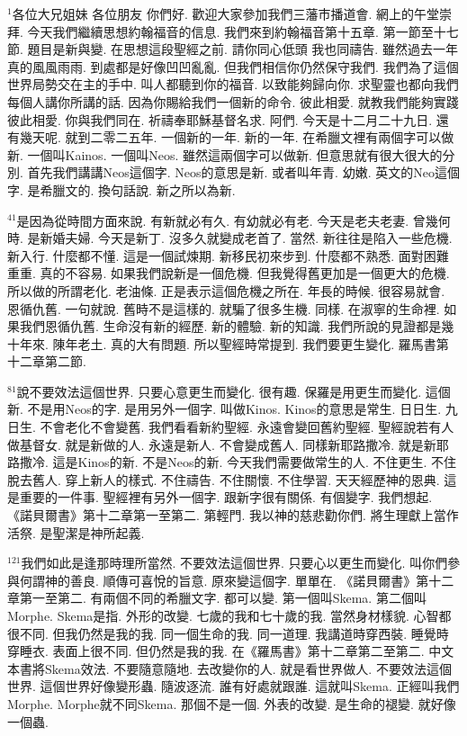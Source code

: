 \documentclass{book}
\begin{document}
$^{1}$各位大兄姐妹 各位朋友 你們好.
歡迎大家參加我們三藩市播道會.
網上的午堂崇拜.
今天我們繼續思想約翰福音的信息.
我們來到約翰福音第十五章.
第一節至十七節.
題目是新與變.
在思想這段聖經之前.
請你同心低頭 我也同禱告.
雖然過去一年真的風風雨雨.
到處都是好像凹凹亂亂.
但我們相信你仍然保守我們.
我們為了這個世界局勢交在主的手中.
叫人都聽到你的福音.
以致能夠歸向你.
求聖靈也都向我們每個人講你所講的話.
因為你賜給我們一個新的命令.
彼此相愛.
就教我們能夠實踐彼此相愛.
你與我們同在.
祈禱奉耶穌基督名求.
阿們.
今天是十二月二十九日.
還有幾天呢.
就到二零二五年.
一個新的一年.
新的一年.
在希臘文裡有兩個字可以做新.
一個叫Kainos.
一個叫Neos.
雖然這兩個字可以做新.
但意思就有很大很大的分別.
首先我們講講Neos這個字.
Neos的意思是新.
或者叫年青.
幼嫩.
英文的Neo這個字.
是希臘文的.
換句話說.
新之所以為新.

$^{41}$是因為從時間方面來說.
有新就必有久.
有幼就必有老.
今天是老夫老妻.
曾幾何時.
是新婚夫婦.
今天是新丁.
沒多久就變成老首了.
當然.
新往往是陷入一些危機.
新入行.
什麼都不懂.
這是一個試煉期.
新移民初來步到.
什麼都不熟悉.
面對困難重重.
真的不容易.
如果我們說新是一個危機.
但我覺得舊更加是一個更大的危機.
所以做的所謂老化.
老油條.
正是表示這個危機之所在.
年長的時候.
很容易就會.
恩循仇舊.
一句就說.
舊時不是這樣的.
就騙了很多生機.
同樣.
在淑寧的生命裡.
如果我們恩循仇舊.
生命沒有新的經歷.
新的體驗.
新的知識.
我們所說的見證都是幾十年來.
陳年老土.
真的大有問題.
所以聖經時常提到.
我們要更生變化.
羅馬書第十二章第二節.

$^{81}$說不要效法這個世界.
只要心意更生而變化.
很有趣.
保羅是用更生而變化.
這個新.
不是用Neos的字.
是用另外一個字.
叫做Kinos.
Kinos的意思是常生.
日日生.
九日生.
不會老化不會變舊.
我們看看新約聖經.
永遠會變回舊約聖經.
聖經說若有人做基督女.
就是新做的人.
永遠是新人.
不會變成舊人.
同樣新耶路撒冷.
就是新耶路撒冷.
這是Kinos的新.
不是Neos的新.
今天我們需要做常生的人.
不住更生.
不住脫去舊人.
穿上新人的樣式.
不住禱告.
不住關懷.
不住學習.
天天經歷神的恩典.
這是重要的一件事.
聖經裡有另外一個字.
跟新字很有關係.
有個變字.
我們想起.
《諾貝爾書》第十二章第一至第二.
第輕門.
我以神的慈悲勸你們.
將生理獻上當作活祭.
是聖潔是神所起義.

$^{121}$我們如此是逢那時理所當然.
不要效法這個世界.
只要心以更生而變化.
叫你們參與何謂神的善良.
順傳可喜悅的旨意.
原來變這個字.
單單在.
《諾貝爾書》第十二章第一至第二.
有兩個不同的希臘文字.
都可以變.
第一個叫Skema.
第二個叫Morphe.
Skema是指.
外形的改變.
七歲的我和七十歲的我.
當然身材樣貌.
心智都很不同.
但我仍然是我的我.
同一個生命的我.
同一道理.
我講道時穿西裝.
睡覺時穿睡衣.
表面上很不同.
但仍然是我的我.
在《羅馬書》第十二章第二至第二.
中文本書將Skema效法.
不要隨意隨地.
去改變你的人.
就是看世界做人.
不要效法這個世界.
這個世界好像變形蟲.
隨波逐流.
誰有好處就跟誰.
這就叫Skema.
正經叫我們Morphe.
Morphe就不同Skema.
那個不是一個.
外表的改變.
是生命的褪變.
就好像一個蟲.
\end{document}

